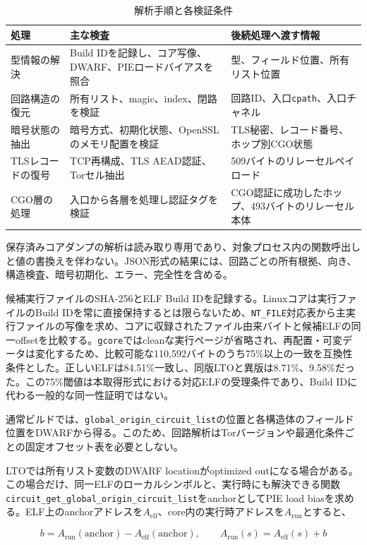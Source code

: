 \documentclass[10pt,a4paper]{ltjsarticle}
\newcommand{\code}[1]{\nolinkurl{#1}}
\begin{document}
\begin{table}[!tbp]
\centering
\caption{解析手順と各検証条件}
\label{tab:pipeline}
\small
\begin{tabularx}{\linewidth}{L{27mm}YY}
\toprule
処理 & 主な検査 & 後続処理へ渡す情報 \\
\midrule
型情報の解決 & Build IDを記録し、コア写像、DWARF、PIEロードバイアスを照合 & 型、フィールド位置、所有リスト位置 \\
回路構造の復元 & 所有リスト、magic、index、閉路を検証 & 回路ID、入口\code{cpath}、入口チャネル \\
暗号状態の抽出 & 暗号方式、初期化状態、OpenSSLのメモリ配置を検証 & TLS秘密、レコード番号、ホップ別CGO状態 \\
TLSレコードの復号 & TCP再構成、TLS AEAD認証、Torセル抽出 & 509バイトのリレーセルペイロード \\
CGO層の処理 & 入口から各層を処理し認証タグを検証 & CGO認証に成功したホップ、493バイトのリレーセル本体 \\
\bottomrule
\end{tabularx}
\end{table}

保存済みコアダンプの解析は読み取り専用であり、対象プロセス内の関数呼出しと値の書換えを伴わない。JSON形式の結果には、回路ごとの所有根拠、向き、構造検査、暗号初期化、エラー、完全性を含める。


候補実行ファイルのSHA-256とELF Build IDを記録する。Linuxコアは実行ファイルのBuild IDを常に直接保持するとは限らないため、\code{NT_FILE}対応表から主実行ファイルの写像を求め、コアに収録されたファイル由来バイトと候補ELFの同一offsetを比較する。\code{gcore}ではcleanな実行ページが省略され、再配置・可変データは変化するため、比較可能な110,592バイトのうち75\%以上の一致を互換性条件とした。正しいELFは84.51\%一致し、同版LTOと異版は8.71\%、9.58\%だった。この75\%閾値は本取得形式における対応ELFの受理条件であり、Build IDに代わる一般的な同一性証明ではない。

通常ビルドでは、\code{global_origin_circuit_list}の位置と各構造体のフィールド位置をDWARFから得る。このため、回路解析はTorバージョンや最適化条件ごとの固定オフセット表を必要としない。

LTOでは所有リスト変数のDWARF locationがoptimized outになる場合がある。この場合だけ、同一ELFのローカルシンボルと、実行時にも解決できる関数\code{circuit_get_global_origin_circuit_list}をanchorとしてPIE load biasを求める。ELF上のanchorアドレスを$A_{\mathrm{elf}}$、core内の実行時アドレスを$A_{\mathrm{run}}$とすると、

\begin{equation}
 b=A_{\mathrm{run}}(\mathrm{anchor})-A_{\mathrm{elf}}(\mathrm{anchor}),\qquad
 A_{\mathrm{run}}(s)=A_{\mathrm{elf}}(s)+b
\end{equation}
\end{document}
